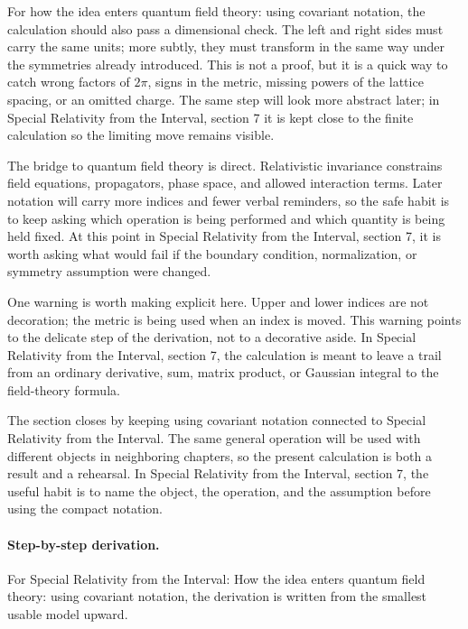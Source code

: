 For how the idea enters quantum field theory: using covariant notation, the calculation should also pass a dimensional check.  The left and right sides must carry the same units; more subtly, they must transform in the same way under the symmetries already introduced.  This is not a proof, but it is a quick way to catch wrong factors of \(2\pi\), signs in the metric, missing powers of the lattice spacing, or an omitted charge.  The same step will look more abstract later; in Special Relativity from the Interval, section 7 it is kept close to the finite calculation so the limiting move remains visible.

The bridge to quantum field theory is direct.  Relativistic invariance constrains field equations, propagators, phase space, and allowed interaction terms.  Later notation will carry more indices and fewer verbal reminders, so the safe habit is to keep asking which operation is being performed and which quantity is being held fixed.  At this point in Special Relativity from the Interval, section 7, it is worth asking what would fail if the boundary condition, normalization, or symmetry assumption were changed.

One warning is worth making explicit here.  Upper and lower indices are not decoration; the metric is being used when an index is moved.  This warning points to the delicate step of the derivation, not to a decorative aside.  In Special Relativity from the Interval, section 7, the calculation is meant to leave a trail from an ordinary derivative, sum, matrix product, or Gaussian integral to the field-theory formula.

The section closes by keeping using covariant notation connected to Special Relativity from the Interval.  The same general operation will be used with different objects in neighboring chapters, so the present calculation is both a result and a rehearsal.  In Special Relativity from the Interval, section 7, the useful habit is to name the object, the operation, and the assumption before using the compact notation.



\paragraph{Step-by-step derivation.}

For Special Relativity from the Interval: How the idea enters quantum field theory: using covariant notation, the derivation is written from the smallest usable model upward.

